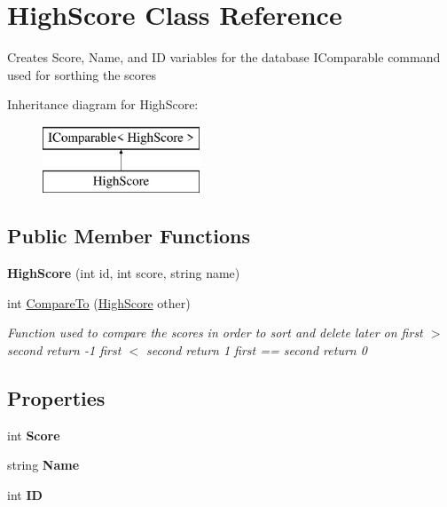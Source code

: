 \hypertarget{class_high_score}{}\section{High\+Score Class Reference}
\label{class_high_score}


Creates Score, Name, and ID variables for the database I\+Comparable command used for sorthing the scores  


Inheritance diagram for High\+Score\+:\begin{figure}[H]
\begin{center}
\leavevmode
\includegraphics[height=2.000000cm]{class_high_score}
\end{center}
\end{figure}
\subsection*{Public Member Functions}
\begin{DoxyCompactItemize}
\item 
\mbox{\label{class_high_score_a5daf0643089c0f0e39a6edfd3e18b56d}} 
{\bfseries High\+Score} (int id, int score, string name)
\item 
int \mbox{\hyperlink{class_high_score_acd16825af79f7d613806515c82d27674}{Compare\+To}} (\mbox{\hyperlink{class_high_score}{High\+Score}} other)
\begin{DoxyCompactList}\small\item\em Function used to compare the scores in order to sort and delete later on first $>$ second return -\/1 first $<$ second return 1 first == second return 0 \end{DoxyCompactList}\end{DoxyCompactItemize}
\subsection*{Properties}
\begin{DoxyCompactItemize}
\item 
\mbox{\label{class_high_score_a3f5ecd5b588c553ac2f35fb25cd7cbda}} 
int {\bfseries Score}
\item 
\mbox{\label{class_high_score_a60bfe5afabcb76145a58093d8d2c415c}} 
string {\bfseries Name}
\item 
\mbox{\label{class_high_score_a8847e1da15aec2b4b3848fdf8ee5eabf}} 
int {\bfseries ID}
\end{DoxyCompactItemize}


